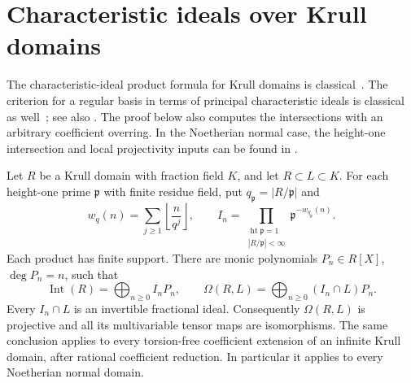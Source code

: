 \section{Characteristic ideals over Krull domains}

The characteristic-ideal product formula for Krull domains is
classical~\cite[Proposition~2.1, author pp.~2--3]{Chabert2003Factorial}.
The criterion for a regular basis in terms of principal characteristic
ideals is classical as well~\cite[Proposition~2.4 and Corollary~2.5,
author p.~4]{Chabert2003Factorial}; see also
\cite[Proposition~5]{Chabert2014RegularBases}.
The proof below also computes the intersections with an arbitrary
coefficient overring. In the Noetherian normal case, the height-one
intersection and local projectivity inputs can be found in
\cite[Tags~031T and 00NX]{StacksNormalDomains}.

\begin{theorem}\label{thm:krull-characteristic-decomposition}
Let $R$ be a Krull domain with fraction field $K$, and let
$R\subset L\subset K$. For each height-one prime $\mathfrak p$ with
finite residue field, put $q_{\mathfrak p}=|R/\mathfrak p|$ and
\[
 w_q(n)=\sum_{j\ge1}\left\lfloor\frac n{q^j}\right\rfloor,
 \qquad I_n=\prod_{\substack{\operatorname{ht}\mathfrak p=1\\
                         |R/\mathfrak p|<\infty}}
                      \mathfrak p^{-w_{q_{\mathfrak p}}(n)}.
\]
Each product has finite support. There are monic polynomials
$P_n\in R[X]$, $\deg P_n=n$, such that
\[
 \operatorname{Int}(R)=\bigoplus_{n\ge0}I_nP_n,
 \qquad
 \Omega(R,L)=\bigoplus_{n\ge0}(I_n\cap L)P_n.
\]
Every $I_n\cap L$ is an invertible fractional ideal. Consequently
$\Omega(R,L)$ is projective and all its multivariable tensor maps
are isomorphisms. The same conclusion applies to every torsion-free
coefficient extension of an infinite Krull domain, after rational
coefficient reduction. In particular it applies to every Noetherian
normal domain.
\end{theorem}

